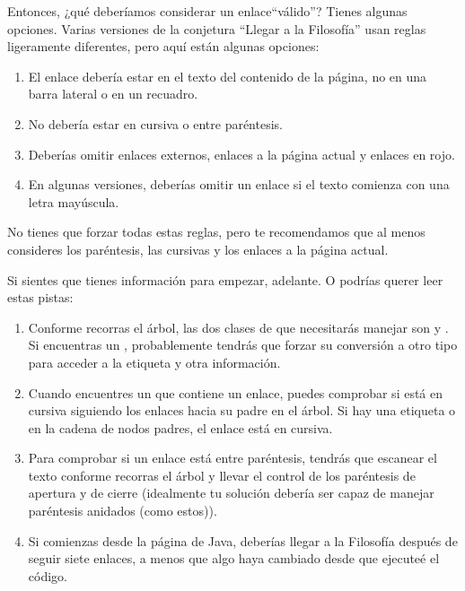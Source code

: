 \documentclass[12pt]{book}
\theoremstyle{exercise}
\begin{document}

Entonces, ¿qué deberíamos considerar un enlace``válido''? Tienes algunas opciones.
Varias versiones de la conjetura ``Llegar a la Filosofía'' usan reglas
ligeramente diferentes, pero aquí están algunas opciones:

\begin{enumerate}

\item
  El enlace debería estar en el texto del contenido de la página, no en una
  barra lateral o en un recuadro.

\item
  No debería estar en cursiva o entre paréntesis.

\item
  Deberías omitir enlaces externos, enlaces a la página actual y enlaces
  en rojo.

\item
  En algunas versiones, deberías omitir un enlace si el texto comienza
  con una letra mayúscula.

\end{enumerate}

No tienes que forzar todas estas reglas, pero te recomendamos que al menos
consideres los paréntesis, las cursivas y los enlaces a la página actual.

Si sientes que tienes información para empezar, adelante.
O podrías querer leer estas pistas:

\begin{enumerate}

\item
  Conforme recorras el árbol, las dos clases de  que necesitarás
  manejar son  y . Si encuentras
  un , probablemente tendrás que forzar su conversión a otro tipo
  para acceder a la etiqueta y otra información.

\item
  Cuando encuentres un  que contiene un enlace, puedes comprobar
  si está en cursiva siguiendo los enlaces hacia su padre en el árbol. Si hay
  una etiqueta  o  en la cadena de nodos padres, el
  enlace está en cursiva.

\item
  Para comprobar si un enlace está entre paréntesis, tendrás que escanear
  el texto conforme recorras el árbol y llevar el control de los paréntesis
  de apertura y de cierre (idealmente tu solución debería ser capaz de
  manejar paréntesis anidados (como estos)).

\item
  Si comienzas desde la página de Java, deberías llegar a la Filosofía
  después de seguir siete enlaces, a menos que algo haya cambiado desde
  que ejecuteé el código.

\end{enumerate}
\end{document}
